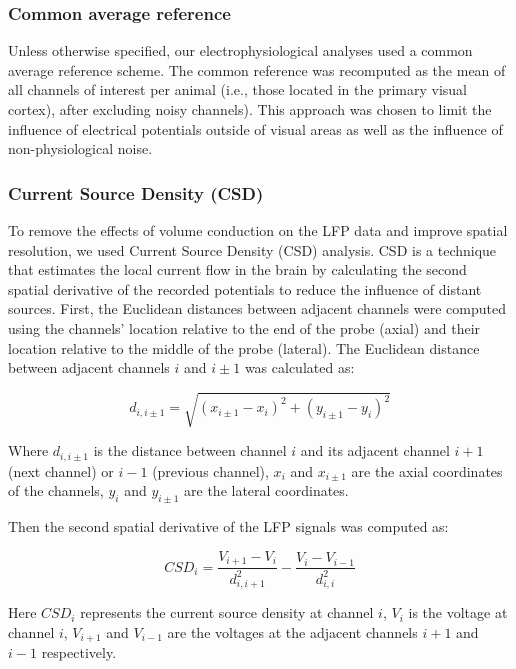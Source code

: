 \documentclass[
  letterpaper,
  DIV=11,
  numbers=noendperiod]{scrartcl}
\begin{document}
\subsubsection{Common average reference}\label{common-average-reference}

Unless otherwise specified, our electrophysiological analyses used a
common average reference scheme. The common reference was recomputed as
the mean of all channels of interest per animal (i.e., those located in
the primary visual cortex), after excluding noisy channels). This
approach was chosen to limit the influence of electrical potentials
outside of visual areas as well as the influence of non-physiological
noise.

\subsubsection{Current Source Density
(CSD)}\label{current-source-density-csd}

To remove the effects of volume conduction on the LFP data and improve
spatial resolution, we used Current Source Density (CSD) analysis. CSD
is a technique that estimates the local current flow in the brain by
calculating the second spatial derivative of the recorded potentials to
reduce the influence of distant sources. First, the Euclidean distances
between adjacent channels were computed using the channels' location
relative to the end of the probe (axial) and their location relative to
the middle of the probe (lateral). The Euclidean distance between
adjacent channels \(i\) and \(i \pm 1\) was calculated as:

\[
d_{i,i \pm 1} = \sqrt{(x_{i \pm 1} - x_i)^2 + (y_{i \pm 1} - y_i)^2}
\]

Where \(d_{i,i \pm 1}\) is the distance between channel \(i\) and its
adjacent channel \(i+1\) (next channel) or \(i-1\) (previous channel),
\(x_i\) and \(x_{i \pm 1}\) are the axial coordinates of the channels,
\(y_i\) and \(y_{i \pm 1}\) are the lateral coordinates.

Then the second spatial derivative of the LFP signals was computed as:

\[
CSD_i = \frac{V_{i+1} - V_i}{d_{i, i+1}^2} - \frac{V_i - V_{i-1}}{d_{i, i}^2}
\]

Here \(CSD_i\) represents the current source density at channel \(i\),
\(V_i\) is the voltage at channel \(i\), \(V_{i+1}\) and \(V_{i-1}\) are
the voltages at the adjacent channels \(i+1\) and \(i-1\) respectively.
\end{document}
